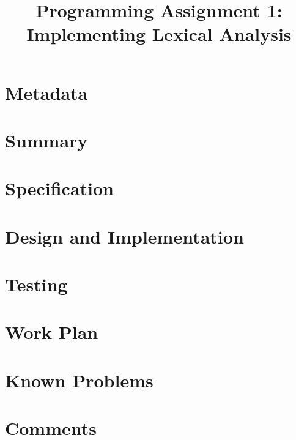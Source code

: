 \documentclass{hw}
\title{Programming Assignment 1:\\ Implementing Lexical Analysis}
\begin{document}
\maketitle

\section*{Metadata}\label{sec:metadata}
\section*{Summary}\label{sec:summary}
\section*{Specification}\label{sec:specification}
\section*{Design and Implementation}\label{sec:design}
\section*{Testing}\label{sec:testing}
\section*{Work Plan}\label{sec:workplan}
\section*{Known Problems}\label{sec:problems}
\section*{Comments}\label{sec:comments}
\end{document}
